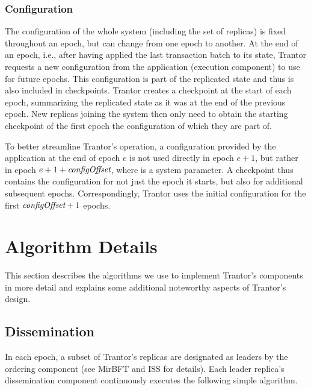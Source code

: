 \documentclass{article}
\begin{document}
\subsubsection{Configuration}

The configuration of the whole system (including the set of replicas) is fixed throughout an epoch,
but can change from one epoch to another.
At the end of an epoch, i.e., after having applied the last transaction batch to its state,
Trantor requests a new configuration from the application (execution component) to use for future epochs.
This configuration is part of the replicated state and thus is also included in checkpoints.
Trantor creates a checkpoint at the start of each epoch,
summarizing the replicated state as it was at the end of the previous epoch.
New replicas joining the system then only need to obtain the starting checkpoint
of the first epoch the configuration of which they are part of.

To better streamline Trantor’s operation,
a configuration provided by the application at the end of epoch $e$ is not used directly in epoch $e+1$,
but rather in epoch $e+1+\textit{configOffset}$, where  is a system parameter.
A checkpoint thus contains the configuration for not just the epoch it starts,
but also for  additional subsequent epochs.
Correspondingly, Trantor uses the initial configuration for the first $\textit{configOffset}+1$ epochs.

\section{Algorithm Details}
\label{sec:algorithm-details}

This section describes the algorithms we use to implement Trantor’s components in more detail
and explains some additional noteworthy aspects of Trantor’s design.

\subsection{Dissemination}

In each epoch, a subset of Trantor’s replicas are designated as leaders by the ordering component
(see MirBFT \cite{mirbft} and ISS \cite{iss} for details).
Each leader replica’s dissemination component continuously executes the following simple algorithm.
\end{document}
